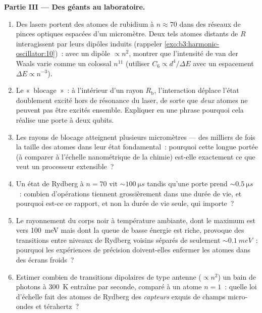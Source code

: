 \begin{problem}
\medskip\noindent\textbf{Partie III --- Des géants au laboratoire.}
\begin{enumerate}[resume]
  \item Des lasers portent des atomes de rubidium à $n \approx 70$
        dans des réseaux de pinces optiques espacées d'un micromètre.
        Deux tels atomes distants de $R$ interagissent par leurs
        dipôles induits (rappeler
        \cref{exo:b3:harmonic-oscillator:10})~: avec un dipôle
        $\propto n^2$, montrer que l'intensité de van der Waals varie
        comme un colossal $n^{11}$ (utiliser $C_6 \propto d^4/\Delta E$
        avec un espacement $\Delta E \propto n^{-3}$).
  \item Le «~blocage~»~: à l'intérieur d'un rayon $R_{\text{b}}$,
        l'interaction déplace l'état doublement excité hors de
        résonance du laser, de sorte que \emph{deux} atomes ne
        peuvent pas être excités ensemble. Expliquer en une phrase
        pourquoi cela réalise une porte à deux qubits.
  \item Les rayons de blocage atteignent plusieurs micromètres ---
        des milliers de fois la taille des atomes dans leur état
        fondamental~: pourquoi cette longue portée (à comparer à
        l'échelle nanométrique de la chimie) est-elle exactement ce
        que veut un processeur extensible~?
  \item Un état de Rydberg à $n = 70$ vit $\sim\qty{100}{\micro s}$
        tandis qu'une porte prend $\sim\qty{0.5}{\micro s}$~: combien
        d'opérations tiennent grossièrement dans une durée de vie, et
        pourquoi est-ce ce rapport, et non la durée de vie seule, qui
        importe~?
  \item Le rayonnement du corps noir à température ambiante, dont le
        maximum est vers \qty{100}{meV} mais dont la queue de basse
        énergie est riche, provoque des transitions entre niveaux de
        Rydberg voisins séparés de seulement $\sim\qty{0.1}{meV}$~:
        pourquoi les expériences de précision doivent-elles enfermer
        les atomes dans des écrans froids~?
  \item Estimer combien de transitions dipolaires de type antenne
        ($\propto n^2$) un bain de photons à \qty{300}{K} entraîne
        par seconde, comparé à un atome $n = 1$~: quelle loi
        d'échelle fait des atomes de Rydberg des \emph{capteurs}
        exquis de champs micro-ondes et térahertz~?
\end{enumerate}


\end{problem}
